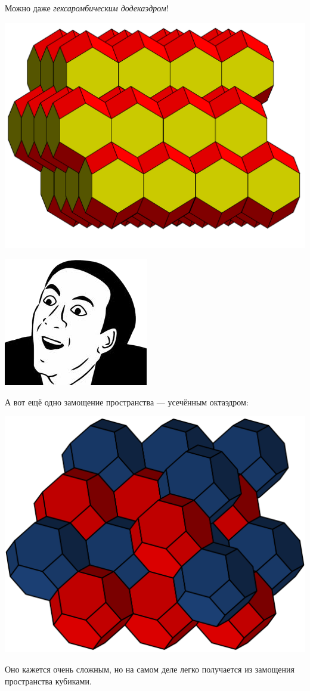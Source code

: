 \documentclass{beamer}
\begin{document}
\begin{frame}

Можно даже \emph{гексаромбическим додекаэдром}!

\begin{center}
\includegraphics[width=\textwidth]{Rhombo-hexagonal_dodecahedron_tessellation.png}
\end{center}


\vspace{-11ex}

\includegraphics[width=.1\textwidth]{meme.png}
\end{frame}


\begin{frame}
А вот ещё одно замощение пространства --- усечённым октаэдром:

\vspace{-2ex}


\begin{center}
\includegraphics[width=.7\textwidth]{Bitruncated_Cubic_Honeycomb.png}
\end{center}

\pause

Оно кажется очень сложным, но на самом деле легко получается из замощения пространства кубиками.


\end{frame}
\end{document}
